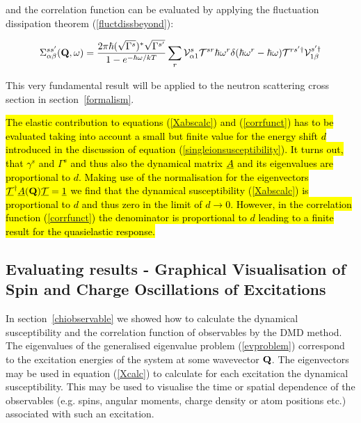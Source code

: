 \noindent and the correlation function \hili{$\M{\m{\Sigma}}$} can be evaluated by applying the 
fluctuation dissipation theorem (\ref{fluctdissbeyond}):

\begin{equation}\label{corrfunct}
{\Sigma^{ss'}_{\alpha\beta}({\mathbf Q},\omega)= 
\frac{2 \pi \hbar(\sqrt{\Gamma^s})^\ast\sqrt{\Gamma^{s'}}}
{1-e^{-\hbar\omega/kT}}
\sum_r
\mathcal V^s_{\alpha1} \mathcal T^{sr} \hbar \omega^r 
\delta(\hbar \omega^r
- \hbar \omega) \mathcal T^{rs'\dag} \mathcal V^{s'\dag}_{1\beta}}
\end{equation}

This very fundamental result will be applied to the neutron scattering cross section
in section~\ref{formalism}.

\hl{
The elastic contribution to equations (\ref{Xabscalc}) and
(\ref{corrfunct}) has to be evaluated taking into account
a small but finite value for the energy shift $d$ introduced
in the discussion of equation (\ref{singleionsusceptibility}). It turns
out, that $\gamma^s$ and $\Gamma^s$ and thus also
the dynamical matrix $\underline{A}$ and its eigenvalues
are proportional to $d$. Making use of the normalisation 
for the eigenvectors
$\underline{\mathcal T}^\dag \underline{A}(\mathbf Q)\underline{\mathcal T}=\underline{1}$
we find that the dynamical susceptibility (\ref{Xabscalc})
is proportional to $d$ and thus zero in the limit of
$d \rightarrow 0$. However, in the  correlation function
(\ref{corrfunct}) the denominator is proportional to
$d$ leading to a finite result for the quasielastic response.
}

\subsection{Evaluating results - Graphical Visualisation of Spin and Charge Oscillations of %
Excitations}\label{visualization}

In section~\ref{chiobservable} we showed how to calculate the dynamical susceptibility and
the correlation function of observables by the DMD method. The eigenvalues of the generalised
eigenvalue problem (\ref{evproblem}) correspond to the excitation energies of the system at some wavevector ${\bf Q}$.
The eigenvectors may be used in equation (\ref{Xcalc}) to calculate for each excitation
the dynamical susceptibility.
This may be used to visualise the time or spatial dependence
of the observables (e.g. spins, angular moments, 
 charge density or atom positions etc.)
associated with such an excitation.

